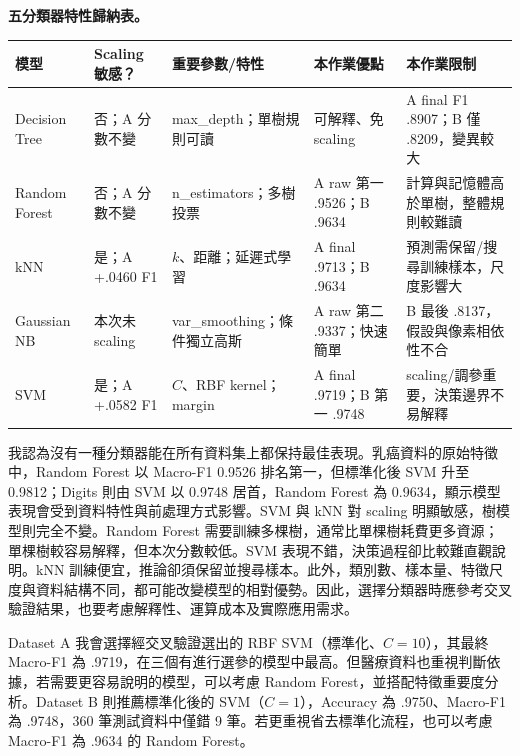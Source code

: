 \textcolor{accent}{\textbf{五分類器特性歸納表。}}
\begin{center}
\scriptsize
{}
\begin{tabularx}{\linewidth}{lC{1.7cm}Y Y Y}
\toprule
模型 & Scaling 敏感？ & 重要參數/特性 & 本作業優點 & 本作業限制 \\
\midrule
Decision Tree & 否；A 分數不變 & max\_depth；單樹規則可讀 & 可解釋、免 scaling & A final F1 .8907；B 僅 .8209，變異較大 \\
Random Forest & 否；A 分數不變 & n\_estimators；多樹投票 & A raw 第一 .9526；B .9634 & 計算與記憶體高於單樹，整體規則較難讀 \\
kNN & 是；A +.0460 F1 & $k$、距離；延遲式學習 & A final .9713；B .9634 & 預測需保留/搜尋訓練樣本，尺度影響大 \\
Gaussian NB & 本次未 scaling & var\_smoothing；條件獨立高斯 & A raw 第二 .9337；快速簡單 & B 最後 .8137，假設與像素相依性不合 \\
SVM & 是；A +.0582 F1 & $C$、RBF kernel；margin & A final .9719；B 第一 .9748 & scaling/調參重要，決策邊界不易解釋 \\
\bottomrule
\end{tabularx}
\end{center}

\label{q23text}
我認為沒有一種分類器能在所有資料集上都保持最佳表現。乳癌資料的原始特徵中，Random Forest 以 Macro-F1 0.9526 排名第一，但標準化後 SVM 升至 0.9812；Digits 則由 SVM 以 0.9748 居首，Random Forest 為 0.9634，顯示模型表現會受到資料特性與前處理方式影響。SVM 與 kNN 對 scaling 明顯敏感，樹模型則完全不變。Random Forest 需要訓練多棵樹，通常比單棵樹耗費更多資源；單棵樹較容易解釋，但本次分數較低。SVM 表現不錯，決策過程卻比較難直觀說明。kNN 訓練便宜，推論卻須保留並搜尋樣本。此外，類別數、樣本量、特徵尺度與資料結構不同，都可能改變模型的相對優勢。因此，選擇分類器時應參考交叉驗證結果，也要考慮解釋性、運算成本及實際應用需求。

Dataset A 我會選擇經交叉驗證選出的 RBF SVM（標準化、$C=10$），其最終 Macro-F1 為 .9719，在三個有進行選參的模型中最高。但醫療資料也重視判斷依據，若需要更容易說明的模型，可以考慮 Random Forest，並搭配特徵重要度分析。Dataset B 則推薦標準化後的 SVM（$C=1$），Accuracy 為 .9750、Macro-F1 為 .9748，360 筆測試資料中僅錯 9 筆。若更重視省去標準化流程，也可以考慮 Macro-F1 為 .9634 的 Random Forest。

